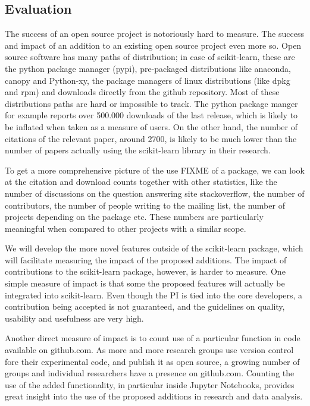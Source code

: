 \subsection{Evaluation}
The success of an open source project is notoriously hard to measure. The
success and impact of an addition to an existing open source project even more
so. Open source software has many paths of distribution; in case of scikit-learn,
these are the python package manager (pypi), pre-packaged distributions like
anaconda, canopy and Python-xy, the package managers of linux distributions (like dpkg and rpm)
and downloads directly from the github repository. Most of these distributions paths are hard
or impossible to track. The python package manger for example reports over 500.000 downloads of the last
release, which is likely to be inflated when taken as a measure of users.
On the other hand, the number of citations of the relevant
paper\cite{pedregosa2011scikit}, around 2700, is likely to be much lower than
the number of papers actually using the scikit-learn library in their research.

To get a more comprehensive picture of the use FIXME of a package, we can look
at the citation and download counts together with other statistics, like the
number of discussions on the question answering site stackoverflow, the number
of contributors, the number of people writing to the mailing list, the number
of projects depending on the package etc.
These numbers are particularly meaningful when compared to other projects with
a similar scope.

We will develop the more novel features outside of the scikit-learn package, which will
facilitate measuring the impact of the proposed additions. The impact of contributions
to the scikit-learn package, however, is harder to measure. One simple measure of impact
is that some the proposed features will actually be integrated into scikit-learn.
Even though the PI is tied into the core developers, a contribution being accepted
is not guaranteed, and the guidelines on quality, usability and usefulness
are very high.

Another direct measure of impact is to count use of a particular function in
code available on github.com. As more and more research groups use version
control fore their experimental code, and publish it as open source, a growing
number of groups and individual researchers have a presence on github.com.
Counting the use of the added functionality, in particular inside Jupyter
Notebooks, provides great insight into the use of the proposed additions in
research and data analysis.


